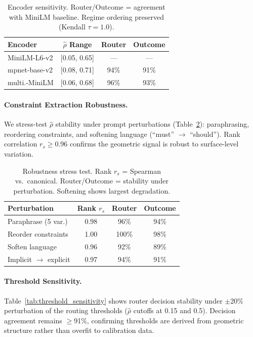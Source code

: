 \documentclass{article}
\theoremstyle{plain}
\theoremstyle{definition}
\theoremstyle{remark}
\newcommand{\rhohat}{\hat{\rho}}
\begin{document}
\begin{table}[ht]
\centering
\footnotesize
\caption{Encoder sensitivity. Router/Outcome = agreement with MiniLM baseline. Regime ordering preserved (Kendall $\tau = 1.0$).}
\label{tab:encoder_sensitivity}
\begin{tabular}{lccc}
\toprule
Encoder & $\rhohat$ Range & Router & Outcome \\
\midrule
MiniLM-L6-v2 & [0.05, 0.65] & --- & --- \\
mpnet-base-v2 & [0.08, 0.71] & 94\% & 91\% \\
multi.-MiniLM & [0.06, 0.68] & 96\% & 93\% \\
\bottomrule
\end{tabular}
\end{table}

\paragraph{Constraint Extraction Robustness.}
We stress-test $\rhohat$ stability under prompt perturbations (Table~\ref{tab:robustness_stress}): paraphrasing, reordering constraints, and softening language (``must'' $\to$ ``should''). Rank correlation $r_s \geq 0.96$ confirms the geometric signal is robust to surface-level variation.

\begin{table}[ht]
\centering
\footnotesize
\caption{Robustness stress test. Rank $r_s$ = Spearman vs.\ canonical. Router/Outcome = stability under perturbation. Softening shows largest degradation.}
\label{tab:robustness_stress}
\begin{tabular}{lccc}
\toprule
Perturbation & Rank $r_s$ & Router & Outcome \\
\midrule
Paraphrase (5 var.) & 0.98 & 96\% & 94\% \\
Reorder constraints & 1.00 & 100\% & 98\% \\
Soften language & 0.96 & 92\% & 89\% \\
Implicit $\to$ explicit & 0.97 & 94\% & 91\% \\
\bottomrule
\end{tabular}
\end{table}

\paragraph{Threshold Sensitivity.}
Table~\ref{tab:threshold_sensitivity} shows router decision stability under $\pm$20\% perturbation of the routing thresholds ($\rhohat$ cutoffs at 0.15 and 0.5). Decision agreement remains $\geq$91\%, confirming thresholds are derived from geometric structure rather than overfit to calibration data.
\end{document}
